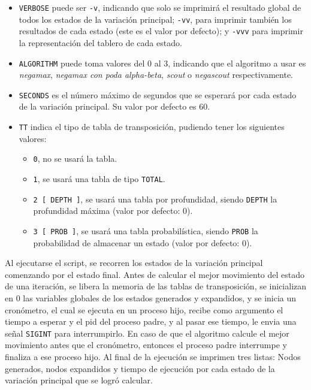 \documentclass[a4paper,10pt]{article}
\begin{document}
  \begin{itemize}
    \item \verb|VERBOSE| puede ser \verb|-v|, indicando que solo se imprimir\'a el resultado 
    global de todos los estados de la variaci\'on principal; \verb|-vv|, para imprimir tambi\'en 
    los resultados de cada estado (este es el valor por defecto); y \verb|-vvv| para 
    imprimir la representaci\'on del tablero de cada estado.

    \item \verb|ALGORITHM| puede toma valores del 0 al 3, indicando que el algoritmo a usar 
    es \textit{negamax}, \textit{negamax con poda alpha-beta}, \textit{scout} o \textit{negascout}
    respectivamente.

    \item \verb|SECONDS| es el n\'umero m\'aximo de segundos que se esperar\'a por cada 
    estado de la variaci\'on principal. Su valor por defecto es 60.

    \item \verb|TT| indica el tipo de tabla de transposici\'on, pudiendo tener los siguientes 
    valores:

    \begin{itemize}
      \item \verb|0|, no se usar\'a la tabla.
      \item \verb|1|, se usar\'a una tabla de tipo \verb|TOTAL|.
      \item \verb|2 [ DEPTH ]|, se usar\'a una tabla por profundidad, siendo \verb|DEPTH| la 
      profundidad m\'axima (valor por defecto: 0).
      \item \verb|3 [ PROB ]|, se usar\'a una tabla probabil\'istica, siendo \verb|PROB| la 
      probabilidad de almacenar un estado (valor por defecto: 0).
    \end{itemize}
  \end{itemize}

  Al ejecutarse el script, se recorren los estados de la variaci\'on principal comenzando por  
  el estado final. Antes de calcular el mejor movimiento del estado de una iteraci\'on, se libera 
  la memoria de las tablas de transposici\'on, se inicializan en 0 las variables globales de 
  los estados generados y expandidos, y se inicia un cron\'ometro, el cual se ejecuta en un proceso 
  hijo, recibe como argumento el tiempo a esperar y el pid del proceso padre, y al pasar ese 
  tiempo, le envia una se\~nal \verb|SIGINT| para interrumpirlo. En caso de que el algoritmo calcule 
  el mejor movimiento antes que el cron\'ometro, entonces el proceso padre interrumpe y finaliza 
  a ese proceso hijo. Al final de la ejecuci\'on se imprimen tres listas: Nodos generados, nodos 
  expandidos y tiempo de ejecuci\'on por cada estado de la variaci\'on principal que se logr\'o 
  calcular.
\end{document}
